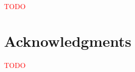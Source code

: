 \documentclass[sn-mathphys]{sn-jnl}%
\theoremstyle{thmstyleone}%
\theoremstyle{thmstyletwo}%
\theoremstyle{thmstylethree}%
\begin{document}
\textcolor{red}{TODO}


\section{Acknowledgments}

\textcolor{red}{TODO}





\end{document}
